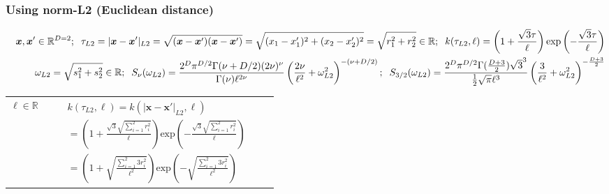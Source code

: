 \documentclass[onecolumn,a4paper,11pt]{article}
\begin{document}
\begin{landscape}
\subsubsection{Using norm-L2 (Euclidean distance)}
\vspace{-8mm}

\begin{table}[H]
\small
\begin{eqnarray*}
\vspace{-20mm}
&&\bm{x}, \bm{x}' \in \mathbb{R}^{D=2}; \hspace{2mm}\tau_{L2} =|\bm{x}-\bm{x}'|_{L2} = \sqrt{(\bm{x}-\bm{x}')(\bm{x}-\bm{x}')} = \sqrt{(x_1-x_1')^2+(x_2-x_2')^2}  = \sqrt{r_1^2+r_2^2} \in \mathbb{R}; \hspace{2mm} k(\tau_{L2},\ell) = \left(1+\frac{\sqrt{3}\tau}{\ell}\right) \mathrm{exp}\left(- \frac{\sqrt{3}\tau}{\ell} \right)\\
&& \omega_{L2}= \sqrt{s_1^2+s_2^2} \in \mathbb{R}; \hspace{2mm} S_{\nu}(\omega_{L2}) = \frac{2^D\pi^{D/2}\Gamma(\nu+D/2)(2\nu)^{\nu}}{\Gamma(\nu)\ell^{2\nu}}\left(\frac{2\nu}{\ell^2}+\omega_{L2}^2 \right)^{-(\nu+D/2)}; \hspace{2mm} S_{3/2}(\omega_{L2}) = \frac{2^D\pi^{D/2}\Gamma(\frac{D+3}{2})\sqrt{3}^3}{\frac{1}{2}\sqrt{\pi}\ell^3}\left(\frac{3}{\ell^2}+\omega_{L2}^2 \right)^{-\frac{D+3}{2}}
\end{eqnarray*}
\normalsize
  \begin{center}
    \begin{tabular}{|c|c|c|c|}
       \hline
       
       \multicolumn{1}{|p{1.5cm}|}{
       \vspace{1mm}
       $\ell \in \mathbb{R}$
       }
       
        & \multicolumn{1}{|p{8.2cm}|}{\small
         \begin{eqnarray*}
		&&k(\tau_{L2},\ell) = k(|\bm{x}-\bm{x}'|_{L2},\ell)\\
		&&= \left(1+\frac{\sqrt{3}\sqrt{\sum_{i=1}^{2}r_i^2}}{\ell} \right)\mathrm{exp}\left(-\frac{\sqrt{3}\sqrt{\sum_{i=1}^{2}r_i^2}}{\ell} \right)\\
		&&= \left(1+\sqrt{\frac{\sum_{i=1}^{2}3r_i^2}{\ell^2}} \right)\mathrm{exp}\left(-\sqrt{\frac{\sum_{i=1}^{2}3r_i^2}{\ell^2}} \right)
         \end{eqnarray*}
       }
       

\end{tabular}
\end{center}
\end{table}
\end{landscape}
\end{document}
